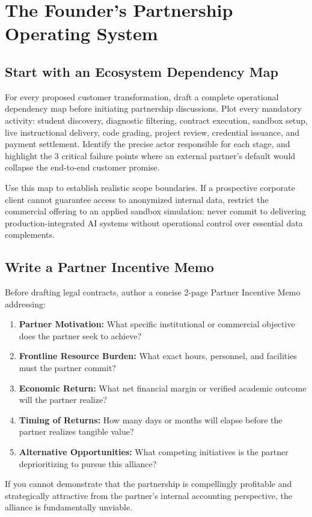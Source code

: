 \section{The Founder's Partnership Operating System}
\label{sec:ch30_founders_partnership_os}

\subsection{Start with an Ecosystem Dependency Map}
\label{sec:start_with_dependency_map}

For every proposed customer transformation, draft a complete operational dependency map before initiating partnership discussions. Plot every mandatory activity: student discovery, diagnostic filtering, contract execution, sandbox setup, live instructional delivery, code grading, project review, credential issuance, and payment settlement. Identify the precise actor responsible for each stage, and highlight the 3 critical failure points where an external partner's default would collapse the end-to-end customer promise.

Use this map to establish realistic scope boundaries. If a prospective corporate client cannot guarantee access to anonymized internal data, restrict the commercial offering to an applied sandbox simulation: never commit to delivering production-integrated AI systems without operational control over essential data complements.

\subsection{Write a Partner Incentive Memo}
\label{sec:write_partner_incentive_memo}

Before drafting legal contracts, author a concise 2-page Partner Incentive Memo addressing:
\begin{enumerate}
\item \textbf{Partner Motivation:} What specific institutional or commercial objective does the partner seek to achieve?
\item \textbf{Frontline Resource Burden:} What exact hours, personnel, and facilities must the partner commit?
\item \textbf{Economic Return:} What net financial margin or verified academic outcome will the partner realize?
\item \textbf{Timing of Returns:} How many days or months will elapse before the partner realizes tangible value?
\item \textbf{Alternative Opportunities:} What competing initiatives is the partner deprioritizing to pursue this alliance?
\end{enumerate}
If you cannot demonstrate that the partnership is compellingly profitable and strategically attractive from the partner's internal accounting perspective, the alliance is fundamentally unviable.

